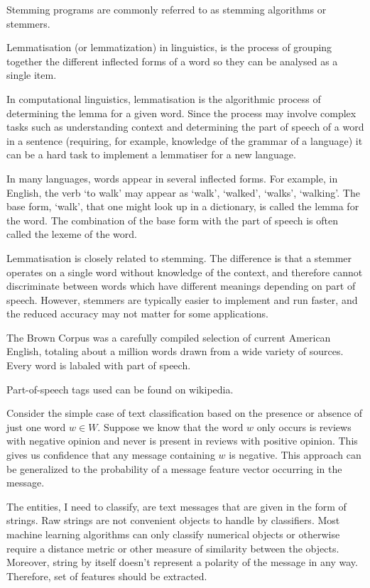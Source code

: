 \documentclass[12pt]{report}
\begin{document}
Stemming programs are commonly referred to as stemming algorithms or stemmers.


Lemmatisation (or lemmatization) in linguistics, is the process of grouping together the different inflected forms of a word so they can be analysed as a single item.

In computational linguistics, lemmatisation is the algorithmic process of determining the lemma for a given word. Since the process may involve complex tasks such as understanding context and determining the part of speech of a word in a sentence (requiring, for example, knowledge of the grammar of a language) it can be a hard task to implement a lemmatiser for a new language.

In many languages, words appear in several inflected forms. For example, in English, the verb ‘to walk’ may appear as ‘walk’, ‘walked’, ‘walks’, ‘walking’. The base form, ‘walk’, that one might look up in a dictionary, is called the lemma for the word. The combination of the base form with the part of speech is often called the lexeme of the word.

Lemmatisation is closely related to stemming. The difference is that a stemmer operates on a single word without knowledge of the context, and therefore cannot discriminate between words which have different meanings depending on part of speech. However, stemmers are typically easier to implement and run faster, and the reduced accuracy may not matter for some applications.


The Brown Corpus was a carefully compiled selection of current American English, totaling about a million words drawn from a wide variety of sources. Every word is labaled with part of speech.

Part-of-speech tags used can be found on wikipedia.

Consider the simple case of text classification based on the presence or absence of just one word $w \in W$. Suppose we know that the word $w$ only occurs is reviews with negative opinion and never is present in reviews with positive opinion. This gives us confidence that any message containing $w$ is negative. This approach can be generalized to the probability of a message feature vector occurring in the message.

The entities, I need to classify, are text messages that are given in the form of strings. Raw strings are not convenient objects to handle by classifiers. Most machine learning algorithms can only classify numerical objects or otherwise require a distance metric or other measure of similarity between the objects. Moreover, string by itself doesn't represent a polarity of the message in any way. Therefore, set of features should be extracted.
\end{document}
